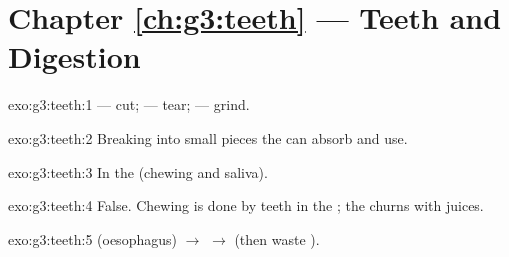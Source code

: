 \section*{Chapter \ref{ch:g3:teeth} --- Teeth and Digestion}

\begin{solution}{exo:g3:teeth:1}
 --- cut;  --- tear;  --- grind.
\end{solution}

\begin{solution}{exo:g3:teeth:2}
Breaking  into small pieces the  can absorb and use.
\end{solution}

\begin{solution}{exo:g3:teeth:3}
In the  (chewing and saliva).
\end{solution}

\begin{solution}{exo:g3:teeth:4}
False. Chewing is done by teeth in the ; the  churns
 with juices.
\end{solution}

\begin{solution}{exo:g3:teeth:5}
 (oesophagus) $\to$  $\to$  (then waste
).
\end{solution}


